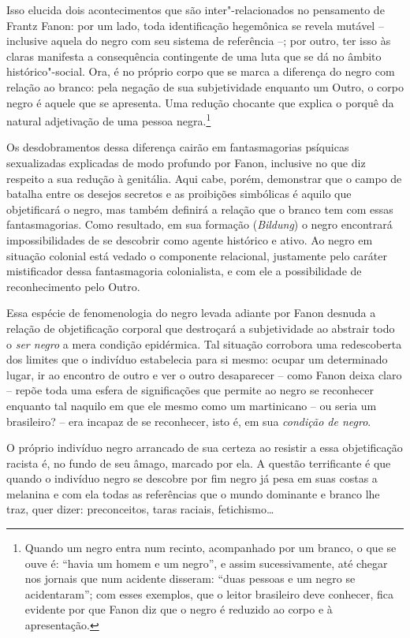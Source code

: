 Isso elucida dois acontecimentos que são inter"-relacionados no
pensamento de Frantz Fanon: por um lado, toda identificação hegemônica
se revela mutável -- inclusive aquela do negro com seu sistema de
referência --; por outro, ter
isso às claras manifesta a consequência contingente de uma luta que se
dá no âmbito histórico"-social. Ora, é no próprio corpo que se marca a
diferença do negro com relação ao branco: pela negação de sua
subjetividade enquanto um Outro, o corpo negro é aquele que se
apresenta. Uma redução chocante que explica o porquê da natural
adjetivação de uma pessoa negra.\footnote{Quando um negro entra num
  recinto, acompanhado por um branco, o que se ouve é: ``havia um homem
  e um negro'', e assim sucessivamente, até chegar nos jornais que num
  acidente disseram: ``duas pessoas e um negro se acidentaram''; com
  esses exemplos, que o leitor brasileiro deve conhecer, fica evidente
  por que Fanon diz que o negro é reduzido ao corpo e à apresentação.}

Os desdobramentos dessa diferença cairão em fantasmagorias psíquicas
sexualizadas explicadas de modo profundo por Fanon, inclusive no que diz
respeito a sua redução à genitália. Aqui cabe, porém, demonstrar que o
campo de batalha entre os desejos secretos e as proibições simbólicas é
aquilo que objetificará o negro, mas também definirá a relação que o
branco tem com essas fantasmagorias. Como resultado, em sua formação
(\emph{Bildung}) o negro encontrará impossibilidades de se descobrir
como agente histórico e ativo. Ao negro em situação colonial está vedado
o componente relacional, justamente pelo caráter mistificador dessa
fantasmagoria colonialista, e com ele a possibilidade de reconhecimento
pelo Outro.

Essa espécie de fenomenologia do negro levada adiante por Fanon desnuda
a relação de objetificação corporal que destroçará a subjetividade ao
abstrair todo o \emph{ser negro} a mera condição epidérmica. Tal
situação corrobora uma redescoberta dos limites que o indivíduo
estabelecia para si mesmo: ocupar um determinado lugar, ir ao encontro
de outro e ver o outro desaparecer -- como Fanon deixa claro -- repõe toda
uma esfera de significações que permite ao negro se reconhecer enquanto
tal naquilo em que ele mesmo como um martinicano -- ou seria um
brasileiro? -- era incapaz de se reconhecer, isto é, em sua
\emph{condição de negro}.

O próprio indivíduo negro arrancado de sua certeza ao resistir a essa
objetificação racista é, no fundo de seu âmago, marcado por ela. A
questão terrificante é que quando o indivíduo negro se descobre por fim
negro já pesa em suas costas a melanina e com ela todas as referências
que o mundo dominante e branco lhe traz, quer dizer: preconceitos, taras
raciais, fetichismo\ldots{}


